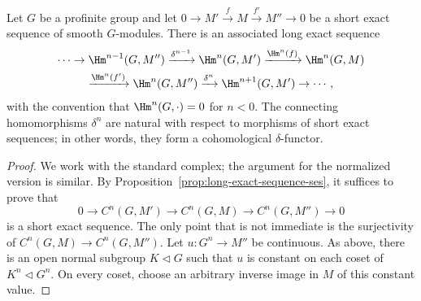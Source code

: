 
\begin{theorem}\label{prop:profinite-cohomology-long}
	Let $G$ be a profinite group and let
	$0\to M'\xrightarrow{f}M\xrightarrow{f'}M''\to0$ be a short exact
	sequence of smooth $G$-modules. There is an associated long exact sequence
	\begin{multline*}
		\cdots\to\Hm^{n-1}(G,M'')\xrightarrow{\delta^{n-1}}
		\Hm^n(G,M')\xrightarrow{\Hm^n(f)}\Hm^n(G,M)\\
		\xrightarrow{\Hm^n(f')}\Hm^n(G,M'')\xrightarrow{\delta^n}
		\Hm^{n+1}(G,M')\to\cdots,
	\end{multline*}
	with the convention that $\Hm^n(G,\cdot)=0$ for $n<0$. The connecting
	homomorphisms $\delta^n$ are natural with respect to morphisms of short
	exact sequences; in other words, they form a cohomological $\delta$-functor.
\end{theorem}
\begin{proof}
	We work with the standard complex; the argument for the normalized version
	is similar. By Proposition~\ref{prop:long-exact-sequence-ses}, it suffices
	to prove that
	\[ 0\to C^n(G,M')\to C^n(G,M)\to C^n(G,M'')\to0 \]
	is a short exact sequence. The only point that is not immediate is the
	surjectivity of $C^n(G,M)\to C^n(G,M'')$. Let $u:G^n\to M''$ be
	continuous. As above, there is an open normal subgroup $K\lhd G$ such
	that $u$ is constant on each coset of $K^n\lhd G^n$. On every coset,
	choose an arbitrary inverse image in $M$ of this constant value.
\end{proof}

